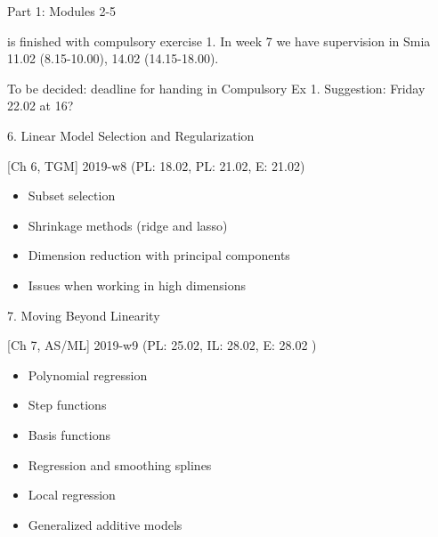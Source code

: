 \documentclass[ignorenonframetext,]{beamer}
\providecommand{\tightlist}{%
  \setlength{\itemsep}{0pt}\setlength{\parskip}{0pt}}
\begin{document}
\begin{frame}

\begin{block}{Part 1: Modules 2-5}

is finished with compulsory exercise 1. In week 7 we have supervision in
Smia 11.02 (8.15-10.00), 14.02 (14.15-18.00).

To be decided: deadline for handing in Compulsory Ex 1. Suggestion:
Friday 22.02 at 16?

\end{block}

\end{frame}

\begin{frame}

\begin{block}{6. Linear Model Selection and Regularization}

{[}Ch 6, TGM{]} 2019-w8 (PL: 18.02, PL: 21.02, E: 21.02)

\begin{itemize}
\tightlist
\item
  Subset selection
\item
  Shrinkage methods (ridge and lasso)
\item
  Dimension reduction with principal components
\item
  Issues when working in high dimensions
\end{itemize}

\end{block}

\end{frame}

\begin{frame}

\begin{block}{7. Moving Beyond Linearity}

{[}Ch 7, AS/ML{]} 2019-w9 (PL: 25.02, IL: 28.02, E: 28.02 )

\begin{itemize}
\tightlist
\item
  Polynomial regression
\item
  Step functions
\item
  Basis functions
\item
  Regression and smoothing splines
\item
  Local regression
\item
  Generalized additive models
\end{itemize}

\end{block}

\end{frame}
\end{document}
